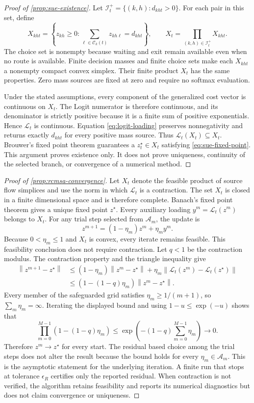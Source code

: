 \documentclass[a4paper,fleqn]{cas-sc}
\newcommand{\norm}[1]{\left\lVert #1 \right\rVert}
\begin{document}
\begin{proof}[Proof of \cref{prop:sue-existence}]
Let
$\mathcal I_t^+=\{(k,h):d_{kht}>0\}$.
For each pair in this set, define
\[
 X_{kht}=
 \left\{
 z_{kh}\ge0:
 \sum_{\ell\in\mathcal C_k(t)}z_{kh\ell}=d_{kht}
 \right\},
 \qquad
 X_t=\prod_{(k,h)\in\mathcal I_t^+}X_{kht}.
\]
The choice set is nonempty because waiting and exit remain available even when
no route is available. Finite decision masses and finite choice sets make each
$X_{kht}$ a nonempty compact convex simplex. Their finite product $X_t$ has the
same properties. Zero mass sources are fixed at zero and require no softmax
evaluation.

Under the stated assumptions, every component of the generalized cost vector
is continuous on $X_t$. The Logit numerator is therefore continuous, and its
denominator is strictly positive because it is a finite sum of positive
exponentials. Hence $\mathcal L_t$ is continuous. Equation
\eqref{eq:logit-loading} preserves nonnegativity and returns exactly
$d_{kht}$ for every positive mass source. Thus
$\mathcal L_t(X_t)\subseteq X_t$. Brouwer's fixed point theorem guarantees a
$z_t^\star\in X_t$ satisfying \cref{eq:sue-fixed-point}. This argument proves
existence only. It does not prove uniqueness, continuity of the selected branch,
or convergence of a numerical method.
\end{proof}

\begin{proof}[Proof of \cref{prop:rcmsa-convergence}]
Let $X_t$ denote the feasible product of source flow simplices and use the norm
in which $\mathcal L_t$ is a contraction. The set $X_t$ is closed in a finite
dimensional space and is therefore complete. Banach's fixed point theorem gives
a unique fixed point $z^\star$. Every auxiliary loading
$y^m=\mathcal L_t(z^m)$ belongs to $X_t$. For any trial step selected from
$\mathcal A_m$, the update is
\[
 z^{m+1}=(1-\eta_m)z^m+\eta_m y^m.
\]
Because $0<\eta_m\le1$ and $X_t$ is convex, every iterate remains feasible.
This feasibility conclusion does not require contraction. Let $q<1$ be the
contraction modulus. The contraction property and the triangle inequality give
\[
 \begin{aligned}
 \norm{z^{m+1}-z^\star}
 &\le
 (1-\eta_m)\norm{z^m-z^\star}
 +\eta_m\norm{\mathcal L_t(z^m)-\mathcal L_t(z^\star)}\\
 &\le
 \left(1-(1-q)\eta_m\right)\norm{z^m-z^\star}.
 \end{aligned}
\]
Every member of the safeguarded grid satisfies
$\eta_m\ge1/(m+1)$, so $\sum_m\eta_m=\infty$. Iterating the displayed bound
and using $1-u\le\exp(-u)$ shows that
\[
 \prod_{m=0}^{M-1}\left(1-(1-q)\eta_m\right)
 \le
 \exp\left(-(1-q)\sum_{m=0}^{M-1}\eta_m\right)
 \longrightarrow0.
\]
Therefore $z^m\to z^\star$ for every start. The residual based choice among
the trial steps does not alter the result because the bound holds for every
$\eta_m\in\mathcal A_m$. This is the asymptotic statement for the underlying
iteration. A finite run that stops at tolerance $\epsilon_R$ certifies only the
reported residual. When contraction is not verified, the algorithm retains
feasibility and reports its numerical diagnostics but does not claim
convergence or uniqueness.
\end{proof}
\end{document}
